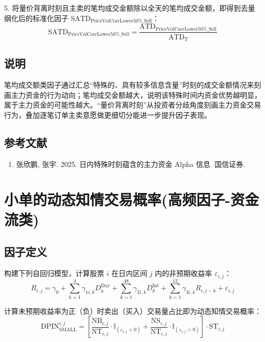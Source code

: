 \documentclass{article}
\begin{document}
5. 将量价背离时刻且主卖的笔均成交金额除以全天的笔均成交金额，即得到去量纲化后的标准化因子 \( \mathrm{SATD}_{\mathrm{PriceVolCorrLower50\%\_Sell}} \)：
\begin{equation}
    \mathrm{SATD}_{\mathrm{PriceVolCorrLower50\%\_Sell}} = \frac{\mathrm{ATD}_{\mathrm{PriceVolCorrLower50\%\_Sell}}}{\mathrm{ATD}_T}
\end{equation}

\subsection{说明}
笔均成交额类因子通过汇总“特殊的、具有较多信息含量”时刻的成交金额情况来刻画主力资金的行为动向；笔均成交金额越大，说明该特殊时间内资金优势越明显，属于主力资金的可能性越大。“量价背离时刻”从投资者分歧角度刻画主力资金交易行为，叠加逐笔订单主卖意愿做更细切分能进一步提升因子表现。

\subsection{参考文献}
\begin{enumerate}
    \item 张欣鹏, 张宇. 2025. 日内特殊时刻蕴含的主力资金 Alpha 信息. 国信证券.
\end{enumerate}

\section{小单的动态知情交易概率(高频因子-资金流类)}

\subsection{因子定义}

构建下列自回归模型，计算股票 \( i \) 在日内区间 \( j \) 内的非预期收益率 \( \varepsilon_{i,j} \)：
\begin{equation}
    R_{i,j} = \gamma_0 + \sum_{k=1}^{4} \gamma_{1i,k} D_k^{\mathrm{Day}} + \sum_{k=1}^{48} \gamma_{2i,k} D_k^{\mathrm{Int}} + \sum_{k=1}^{12} \gamma_{3i,k} R_{i,j-k} + \varepsilon_{i,j}
\end{equation}

计算未预期收益率为正（负）时卖出（买入）交易量占比即为动态知情交易概率：
\begin{equation}
    \mathrm{DPIN}_{\mathrm{SMALL}}^{i,j} = \left[ \frac{\mathrm{NB}_{i,j}}{\mathrm{NT}_{i,j}} \cdot \mathbb{I}_{(\varepsilon_{i,j} < 0)} + \frac{\mathrm{NS}_{i,j}}{\mathrm{NT}_{i,j}} \cdot \mathbb{I}_{(\varepsilon_{i,j} > 0)} \right] \cdot \mathrm{ST}_{i,j}
\end{equation}
\end{document}
